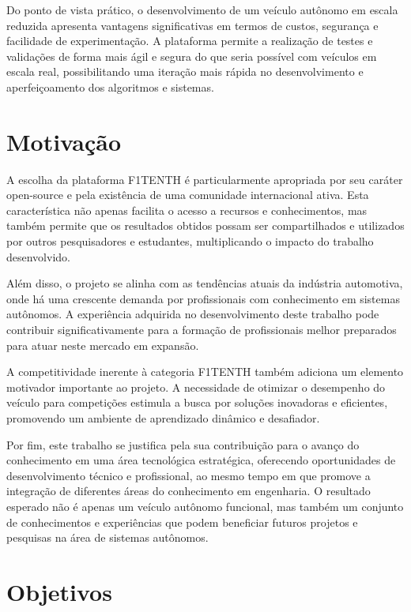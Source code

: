 Do ponto de vista prático, o desenvolvimento de um veículo autônomo em escala
reduzida apresenta vantagens significativas em termos de custos, segurança e
facilidade de experimentação. A plataforma permite a realização de testes e
validações de forma mais ágil e segura do que seria possível com veículos em
escala real, possibilitando uma iteração mais rápida no desenvolvimento e
aperfeiçoamento dos algoritmos e sistemas.

\section*{Motivação}\label{sec:motivacao}

A escolha da plataforma F1TENTH é particularmente apropriada por seu caráter
open-source e pela existência de uma comunidade internacional ativa. Esta
característica não apenas facilita o acesso a recursos e conhecimentos, mas
também permite que os resultados obtidos possam ser compartilhados e utilizados
por outros pesquisadores e estudantes, multiplicando o impacto do trabalho
desenvolvido.

Além disso, o projeto se alinha com as tendências atuais da indústria
automotiva, onde há uma crescente demanda por profissionais com conhecimento em
sistemas autônomos. A experiência adquirida no desenvolvimento deste trabalho
pode contribuir significativamente para a formação de profissionais melhor
preparados para atuar neste mercado em expansão.

A competitividade inerente à categoria F1TENTH também adiciona um elemento
motivador importante ao projeto. A necessidade de otimizar o desempenho do
veículo para competições estimula a busca por soluções inovadoras e eficientes,
promovendo um ambiente de aprendizado dinâmico e desafiador.

Por fim, este trabalho se justifica pela sua contribuição para o avanço do
conhecimento em uma área tecnológica estratégica, oferecendo oportunidades de
desenvolvimento técnico e profissional, ao mesmo tempo em que promove a
integração de diferentes áreas do conhecimento em engenharia. O resultado
esperado não é apenas um veículo autônomo funcional, mas também um conjunto de
conhecimentos e experiências que podem beneficiar futuros projetos e pesquisas
na área de sistemas autônomos.

\section*{Objetivos}\label{sec:objetivos}

